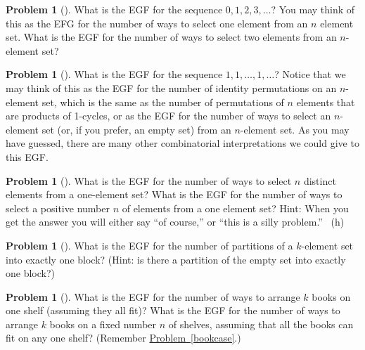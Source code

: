 \documentclass[10pt,]{book}
\theoremstyle{plain}
\theoremstyle{definition}
\newtheorem{activity}[project]{Problem}
\theoremstyle{definition}
\numberwithin{equation}{chapter}
\begin{document}
\begin{activity}[] \label{activity-379}
\hypertarget{p-2062}{}%
What is the EGF for the sequence \(0,1,2,3,\ldots\)? You may think of this as the EFG for the number of ways to select one element from an \(n\) element set. What is the EGF for the number of ways to select two elements from an \(n\)-element set?%
\end{activity}
\begin{activity}[] \label{allonessequence}
\hypertarget{p-2065}{}%
What is the EGF for the sequence \(1,1,\ldots,1,\ldots\)? Notice that we may think of this as the EGF for the number of identity permutations on an \(n\)-element set, which is the same as the number of permutations of \(n\) elements that are products of 1-cycles, or as the EGF for the number of ways to select an \(n\)-element set (or, if you prefer, an empty set) from an \(n\)-element set. As you may have guessed, there are many other combinatorial interpretations we could give to this EGF.%
\end{activity}
\begin{activity}[] \label{activity-381}
\hypertarget{p-2067}{}%
What is the EGF for the number of ways to select \(n\) distinct elements from a one-element set? What is the EGF for the number of ways to select a positive number \(n\) of elements from a one element set?  Hint: When you get the answer you will either say ``of course,'' or ``this is a silly problem.''%
~{\tiny (h)}\end{activity}
\begin{activity}[] \label{oneblockpartitions}
\hypertarget{p-2070}{}%
What is the EGF for the number of partitions of a \(k\)-element set into exactly one block? (Hint: is there a partition of the empty set into exactly one block?)%
\end{activity}
\begin{activity}[] \label{exponentialbookshelf}
\hypertarget{p-2072}{}%
What is the EGF for the number of ways to arrange \(k\) books on one shelf (assuming they all fit)? What is the EGF for the number of ways to arrange \(k\) books on a fixed number \(n\) of shelves, assuming that all the books can fit on any one shelf? (Remember \hyperref[bookcase]{Problem~\ref{bookcase}}.)%
\end{activity}
\typeout{************************************************}
\typeout{************************************************}
\end{document}
